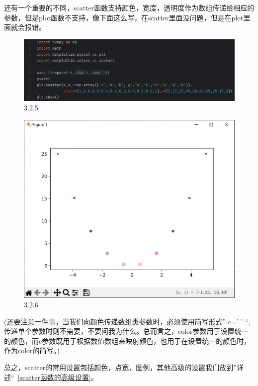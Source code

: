 \documentclass[12pt]{article}
\begin{document}
还有一个重要的不同，scatter函数支持颜色，宽度，透明度作为数组传递给相应的参数，但是plot函数不支持，像下面这么写，在scatter里面没问题，但是在plot里面就会报错。
\begin{figure}[H]
    \centering
    \includegraphics[width=1\linewidth]{点图program3.png}
    \caption{3.2.5}
    \label{fig:enter-label}
\end{figure}
\begin{figure}[H]
    \centering
    \includegraphics[width=0.75\linewidth]{点图Pic3.png}
    \caption{3.2.6}
    \label{fig:enter-label}
\end{figure}
(还要注意一件事，当我们向颜色传递数组类参数时，必须使用简写形式” c=' ' “,传递单个参数时则不需要，不要问我为什么。总而言之，color参数用于设置统一的颜色，而c参数既用于根据数值数组来映射颜色，也用于在设置统一的颜色时，作为color的简写。)

总之，scatter的常用设置包括颜色，点宽，图例，其他高级的设置我们放到”详述“~\ref{scatter函数的高级设置}。
\end{document}
